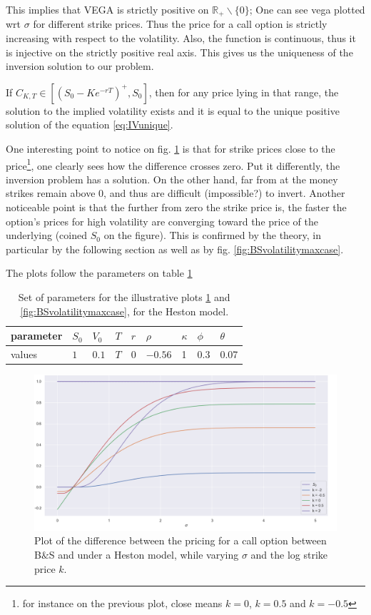 This implies that VEGA is strictly positive on $\mathbb R_+ \backslash \{0 \}$; One can see vega plotted wrt $\sigma$ for different strike prices. Thus the price for a call option is strictly increasing with respect to the volatility. Also, the function is continuous, thus it is injective on the strictly positive real axis. This gives us the uniqueness of the inversion solution to our problem.

If $C_{K,T} \in [ (S_0 - K e^{-rT} )^+, S_0 ]$, then for any price lying in that range, the solution to the implied volatility exists and it is equal to the unique positive solution of the equation \ref{eq:IVunique}.

One interesting point to notice on fig. \ref{fig:vegdif} is that for strike prices close to the price\footnote{for instance on the previous plot, close means $k = 0$, $k = 0.5$ and $k = -0.5$}, one clearly sees how the difference crosses zero. Put it differently, the inversion problem has a solution. On the other hand, far from at the money strikes remain above $0$, and thus are difficult (impossible?) to invert. Another noticeable point is that the further from zero the strike price is, the faster the option's prices for high volatility are converging toward the price of the underlying (coined $S_0$ on the figure). This is confirmed by the theory, in particular by the following section as well as by fig. \ref{fig:BSvolatilitymaxcase}.

The plots follow the parameters on table \ref{table:BSmodels}

\begin{table}
\begin{center}
\begin{tabular}{  | m{2.5cm} | m{1.1 cm} | m{1.1 cm}| m{1.1 cm} |  m{1.1 cm} | m{1.1 cm}| m{1.1 cm} |m{1.1 cm} | m{1.1 cm} |  } 
\hline
parameter & $S_0$ &  $V_0$ & $T$ & $r$ & $\rho$ & $\kappa$ & $\phi$  & $\theta$ \\ 
\hline
values &$1$ & $0.1$ & $T$ & $0$ & $-0.56$ & 1 & 0.3 & 0.07  \\
\hline
\end{tabular}
\caption{Set of parameters for the illustrative plots \ref{fig:vegdif} and \ref{fig:BSvolatilitymaxcase}, for the Heston model.}
\label{table:BSmodels}
\end{center}
\end{table}

\begin{figure}
\centering
\includegraphics[width = 0.7 \textwidth]{../addition_part/images/annexe/vegaint.png}
\caption{Plot of the difference between the pricing for a call option between B$\&$S and under a Heston model, while varying $\sigma$ and the log strike price $k$.}
\label{fig:vegdif}
\end{figure}

